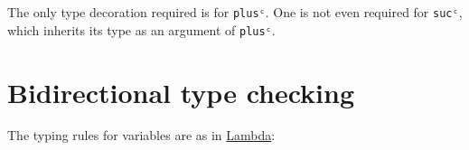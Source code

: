 The only type decoration required is for \texttt{plusᶜ}. One is not even
required for \texttt{sucᶜ}, which inherits its type as an argument of
\texttt{plusᶜ}.

\hypertarget{bidirectional-type-checking}{%
\section{Bidirectional type
checking}\label{bidirectional-type-checking}}

The typing rules for variables are as in
\protect\hyperlink{Lambda}{Lambda}:

\begin{fence}
\begin{code}%
\>[0]\AgdaSpace{}%
\AgdaSpace{}%
\AgdaSymbol{:}\AgdaSpace{}%
\AgdaSpace{}%
\AgdaSpace{}%
\AgdaSpace{}%
\AgdaSpace{}%
\AgdaSpace{}%
\AgdaSpace{}%
\AgdaSpace{}%
\<%
\\
%
\\[\AgdaEmptyExtraSkip]%
\>[0][@{}l@{\AgdaIndent{0}}]%
\>[2]%
\>[280I]\AgdaSymbol{:}%
\>[281I]\AgdaSpace{}%
\AgdaSymbol{\{}\AgdaSpace{}%
\AgdaSpace{}%
\AgdaSymbol{\}}\<%
\\
\>[.][@{}l@{}]\<[281I]%
\>[6]\AgdaComment{--------------------}\<%
\\
\>[.][@{}l@{}]\<[280I]%
\>[4]\AgdaSpace{}%
\AgdaSpace{}%
\AgdaOperator{\AgdaInductiveConstructor{,}}\AgdaSpace{}%
\AgdaSpace{}%
\AgdaSpace{}%
\AgdaSpace{}%
\AgdaSpace{}%
\AgdaSpace{}%
\AgdaSpace{}%
\<%
\\
%
\\[\AgdaEmptyExtraSkip]%
%
\>[2]%
\>[294I]\AgdaSymbol{:}\AgdaSpace{}%
\AgdaSpace{}%
\AgdaSymbol{\{}\AgdaSpace{}%
\AgdaSpace{}%
\AgdaSpace{}%
\AgdaSpace{}%
\AgdaSymbol{\}}\<%
\\
\>[.][@{}l@{}]\<[294I]%
\>[4]\AgdaSpace{}%
\AgdaSpace{}%
\AgdaSpace{}%
\<%
\\

\end{code}
\end{fence}
